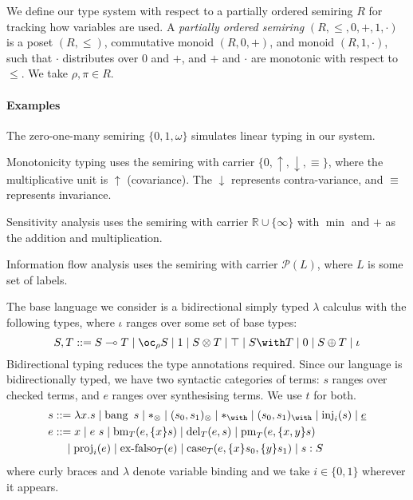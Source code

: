 We define our type system with respect to a partially ordered semiring
$R$ for tracking how variables are used. A \emph{partially ordered
  semiring} $(R, \leq, 0, +, 1 , \cdot)$ is a poset $(R, \leq)$,
commutative monoid $(R, 0, +)$, and monoid $(R, 1, \cdot)$, such that
$\cdot$ distributes over $0$ and $+$, and $+$ and $\cdot$ are
monotonic with respect to $\leq$. We take $\rho,\pi \in R$.

\paragraph{Examples}
\begin{inparaenum}
\item The zero-one-many semiring $\{0,1,\omega\}$ simulates linear
  typing in our system.
\item Monotonicity typing uses the semiring with carrier
  $\{0,\uparrow,\downarrow,\equiv\}$, where the multiplicative unit is
  $\uparrow$ (covariance). The $\downarrow$ represents
  contra-variance, and $\equiv$ represents invariance.
\item Sensitivity analysis uses the semiring with carrier
  $\mathbb{R} \cup \{\infty\}$ with $\min$ and $+$ as the addition and
  multiplication.
\item Information flow analysis uses the semiring with carrier
  $\mathcal{P}(L)$, where $L$ is some set of labels.
\end{inparaenum}

\medskip

The base language we consider is a
bidirectional \cite{DBLP:journals/toplas/PierceT00} simply typed
$\lambda$ calculus with the following types, where $\iota$ ranges over
some set of base types:
\begin{displaymath}
  S,T ::= \fun{S}{T} \mid \excl{\rho}{S} \mid \tensorOne \mid \tensor{S}{T} \mid
  \withTOne \mid \withT{S}{T} \mid \sumTZero \mid \sumT{S}{T} \mid \iota
\end{displaymath}
Bidirectional typing reduces the type annotations required.  Since our
language is bidirectionally typed, we have two syntactic categories of
terms: $s$ ranges over checked terms, and $e$ ranges over synthesising
terms. We use $t$ for both.
\begin{displaymath}
  \begin{aligned}
    s &  ::= \lam{x}{s} \mid \bang{s} \mid \unit \mid \ten{s_0}{s_1} \mid \eat \mid \wth{s_0}{s_1} \mid \inj{i}{s} \mid \emb{e} \\
    e &  ::= x \mid \app{e}{s} \mid \bm{T}{e}{\bind{x}{s}} \mid \del{T}{e}{s} \mid \prm{T}{e}{\bind{x,y}{s}} \\
      & \quad \mid \proj{i}{e} \mid \exf{T}{e} \mid
             \cse{T}{e}{\bind{x}{s_0}}{\bind{y}{s_1}} \mid \ann{s}{S}
  \end{aligned}
\end{displaymath}
where curly braces and $\lambda$ denote variable binding and we take
$i \in \{0,1\}$ wherever it appears.


